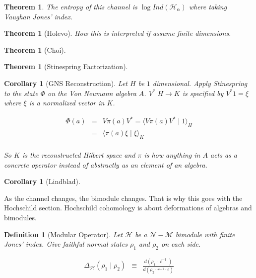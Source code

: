 \documentclass[11pt]{article}
\theoremstyle{change}
\newtheorem{definition}[equation]{Definition}
\newtheorem{theorem}[equation]{Theorem}
\newtheorem{cor}[equation]{Corollary}
\theoremstyle{nonumberplain}
\numberwithin{equation}{section}
\begin{document}
\begin{theorem}
The entropy of this channel is $\log Ind(\mathcal{H}_\alpha)$ where taking Vaughan Jones' index.
\end{theorem}

\begin{theorem}[Holevo]
How this is interpreted if assume finite dimensions.
\end{theorem}

\begin{theorem}[Choi]
\end{theorem}

\begin{theorem}[Stinespring Factorization]
\end{theorem}

\begin{cor}[GNS Reconstruction]
Let $H$ be $1$ dimensional. Apply Stinespring to the state $\Phi$ on the Von Neumann algebra $A$. $V^* \; H \to K$ is specified by $V^* 1 = \xi$ where $\xi$ is a normalized vector in $K$.

\begin{eqnarray*}
\Phi (a) &=& V \pi (a) V^* = \langle V \pi (a) V^* \mid 1 \rangle_H\\
&=& \langle \pi (a) \xi \mid \xi \rangle_K\\
\end{eqnarray*}

So $K$ is the reconstructed Hilbert space and $\pi$ is how anything in $A$ acts as a concrete operator instead of abstractly as an element of an algebra.

\end{cor}

\begin{cor}[Lindblad]
\end{cor}

As the channel changes, the bimodule changes. That is why this goes with the Hochschild section. Hochschild cohomology is about deformations of algebras and bimodules.

\begin{definition}[Modular Operator]
Let $\mathcal{H}$ be a $\mathcal{N} - \mathcal{M}$ bimodule with finite Jones' index. Give faithful normal states $\rho_1$ and $\rho_2$ on each side.

\begin{eqnarray*}
\Delta_\mathcal{H} (\rho_1 \mid \rho_2 ) &\equiv& \frac{d (\rho_1 \cdot \ell^{-1} )}{d (\rho_2 \cdot r^{-1} \cdot \epsilon)}
\end{eqnarray*}

\end{definition}
\end{document}

